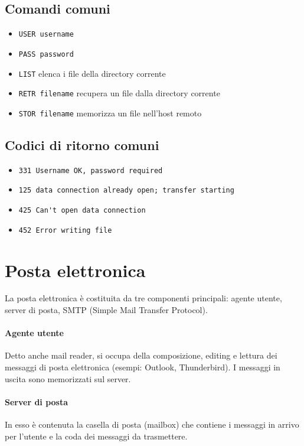 \documentclass{report}
\begin{document}
	\subsection{Comandi comuni}
	\begin{itemize}
		\item \verb|USER username|
		\item \verb|PASS password|
		\item \verb|LIST| elenca i file della directory corrente
		\item \verb|RETR filename| recupera un file dalla directory corrente
		\item \verb|STOR filename| memorizza un file nell'host remoto
	\end{itemize}
	\subsection{Codici di ritorno comuni}
	\begin{itemize}
		\item \verb|331 Username OK, password required|
		\item \verb|125 data connection already open; transfer starting|
		\item \verb|425 Can't open data connection|
		\item \verb|452 Error writing file|
	\end{itemize}
	\section{Posta elettronica}
	La posta elettronica è costituita da tre componenti principali: agente utente, server di posta, SMTP (Simple Mail Transfer Protocol).
	\paragraph{Agente utente} Detto anche mail reader, si occupa della composizione, editing e lettura dei messaggi di posta elettronica (esempi: Outlook, Thunderbird). I messaggi in uscita sono memorizzati sul server.
	\paragraph{Server di posta} In esso è contenuta la casella di posta (mailbox) che contiene i messaggi in arrivo per l'utente e la coda dei messaggi da trasmettere.
\end{document}
